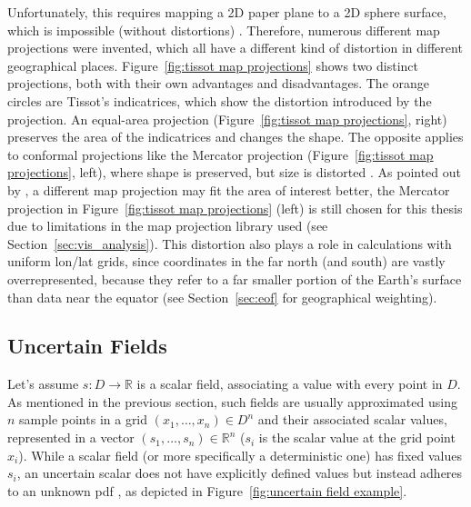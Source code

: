 Unfortunately, this requires mapping a 2D paper plane to a 2D sphere surface, which is impossible (without distortions) \cite{vietinghoffdiss}.
Therefore, numerous different map projections were invented, which all have a different kind of distortion in different geographical places. 
Figure~\ref{fig:tissot map projections} shows two distinct projections, both with their own advantages and disadvantages. 
The orange circles are Tissot’s indicatrices, which show the distortion introduced by the projection. 
An equal-area projection (Figure~\ref{fig:tissot map projections}, right) preserves the area of the indicatrices and changes the shape. 
The opposite applies to conformal projections like the Mercator projection (Figure~\ref{fig:tissot map projections}, left), where shape is preserved, but size is distorted \cite{ghaderpour_map_2016}.
As pointed out by , a different map projection may fit the area of interest better, the Mercator projection in Figure~\ref{fig:tissot map projections} (left) is still chosen for this thesis due to limitations in the map projection library used (see Section~\ref{sec:vis_analysis}). 
This distortion also plays a role in calculations with uniform lon/lat grids, since coordinates in the far north (and south) are vastly overrepresented, because they refer to a far smaller portion of the Earth's surface than data near the equator (see Section~\ref{sec:eof} for geographical weighting). 


\subsection{Uncertain Fields}



Let's assume $s : D \rightarrow \mathbb{R}$ is a scalar field, associating a value  with every point in $D$. 
As mentioned in the previous section, such fields are usually approximated using $n$ sample points in a grid $(x_1,\dots, x_n) \in D^n$ and their associated scalar values, represented in a vector $(s_1,\dots,s_n) \in \mathbb{R}^n$ ($s_i$ is the scalar value at the grid point $x_i$).
While a scalar field (or more specifically a deterministic one) has fixed values $s_i$, an uncertain scalar does not have explicitly defined values but instead adheres to an unknown \ac{pdf} \cite{vietinghoffdiss}, as depicted in Figure~\ref{fig:uncertain field example}. 


